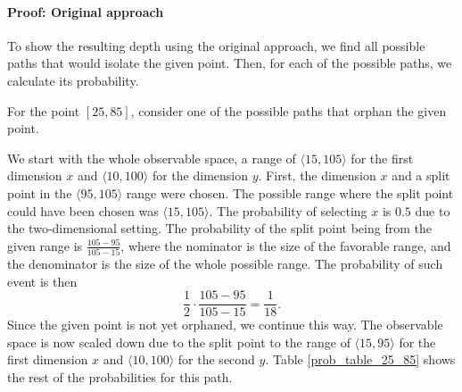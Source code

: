 \paragraph{Proof: Original approach}
To show the resulting depth using the original approach, we find all possible paths that would isolate the given point. Then, for each of the possible paths, we calculate its probability.




For the point $[25,85]$, consider one of the possible paths that orphan the given point.

We start with the whole observable space, a range of $\langle 15, 105\rangle$ for the first dimension $x$ and $\langle 10,100\rangle$ for the dimension $y$.
First, the dimension $x$ and a split point in the $\langle 95, 105\rangle$ range were chosen. The possible range where the split point could have been chosen was $\langle 15,105\rangle$.
The probability of selecting $x$ is $0.5$ due to the two-dimensional setting.
The probability of the split point being from the given range is $\frac{105-95}{105-15}$, where the nominator is the size of the favorable range, and the denominator is the size of the whole possible range.
The probability of such event is then $$\frac{1}{2}\cdot\frac{105-95}{105-15} = \frac{1}{18}.$$
Since the given point is not yet orphaned, we continue this way. The observable space is now scaled down due to the split point to the range of $\langle 15, 95\rangle$ for the first dimension $x$ and $\langle 10,100\rangle$ for the second $y$. Table \ref{prob_table_25_85} shows the rest of the probabilities for this path.

